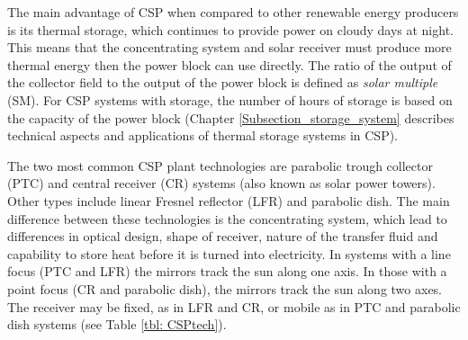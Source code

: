 The main advantage of CSP when compared to other renewable energy producers is its thermal storage, which continues to provide power on cloudy days at night. This means that the concentrating system and solar receiver must produce more thermal energy then the power block can use directly. The ratio of the output of the collector field to the output of the power block is defined as \emph{solar multiple} (SM). For CSP systems with storage, the number of hours of storage is based on the capacity of the power block (Chapter \ref{Subsection_storage_system} describes technical aspects and applications of thermal storage systems in CSP).

The two most common CSP plant technologies are parabolic trough collector (PTC) and central receiver (CR) systems (also known as solar power towers). Other types include linear Fresnel reflector (LFR) and parabolic dish. The main difference between these technologies is the concentrating system, which lead to differences in optical design, shape of receiver, nature of the transfer fluid and capability to store heat before it is turned into electricity. In systems with a line focus (PTC and LFR) the mirrors track the sun along one axis. In those with a point focus (CR and parabolic dish), the mirrors track the sun along two axes. The receiver may be fixed, as in LFR and CR, or mobile as in PTC and parabolic dish systems (see Table \ref{tbl: CSPtech}).

